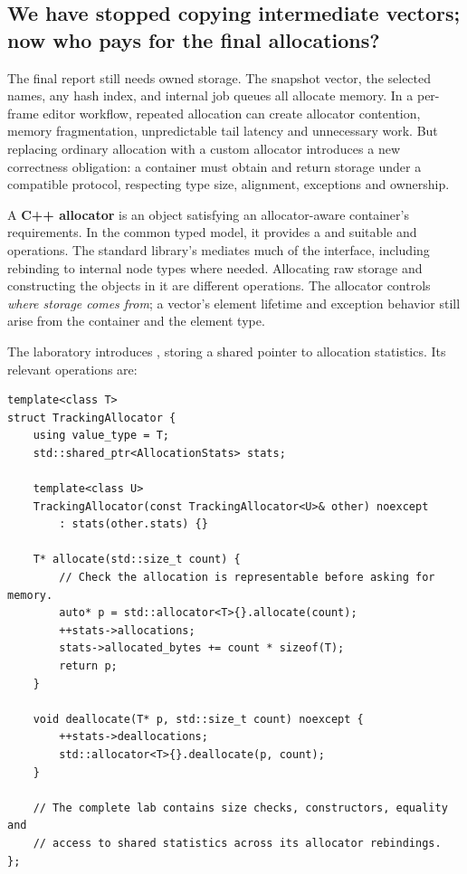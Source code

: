 \subsection{We have stopped copying intermediate vectors; now who pays for the final allocations?}\label{05-engine-i-ch006-we-have-stopped-copying-intermediate-vectors-now-who-pays-for-the-final-allocations}

\hypertarget{05-engine-i-ch006-we-have-stopped-copying-intermediate-vectors-now-who-pays-for-the-final-allocations}{}

The final report still needs owned storage. The snapshot vector, the selected names, any hash index, and internal job queues all allocate memory. In a per-frame editor workflow, repeated allocation can create allocator contention, memory fragmentation, unpredictable tail latency and unnecessary work. But replacing ordinary allocation with a custom allocator introduces a new correctness obligation: a container must obtain and return storage under a compatible protocol, respecting type size, alignment, exceptions and ownership.

A \textbf{C++ allocator} is an object satisfying an allocator-aware container's requirements. In the common typed model, it provides a  and suitable  and  operations. The standard library's  mediates much of the interface, including rebinding to internal node types where needed. Allocating raw storage and constructing the objects in it are different operations. The allocator controls \emph{where storage comes from}; a vector's element lifetime and exception behavior still arise from the container and the element type.

The laboratory introduces , storing a shared pointer to allocation statistics. Its relevant operations are:

\begin{verbatim}
template<class T>
struct TrackingAllocator {
    using value_type = T;
    std::shared_ptr<AllocationStats> stats;

    template<class U>
    TrackingAllocator(const TrackingAllocator<U>& other) noexcept
        : stats(other.stats) {}

    T* allocate(std::size_t count) {
        // Check the allocation is representable before asking for memory.
        auto* p = std::allocator<T>{}.allocate(count);
        ++stats->allocations;
        stats->allocated_bytes += count * sizeof(T);
        return p;
    }

    void deallocate(T* p, std::size_t count) noexcept {
        ++stats->deallocations;
        std::allocator<T>{}.deallocate(p, count);
    }

    // The complete lab contains size checks, constructors, equality and
    // access to shared statistics across its allocator rebindings.
};
\end{verbatim}

